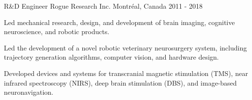\begin{cventries}
\cventry
{R\&D Engineer}
{Rogue Research Inc.}
{Montréal, Canada}
{2011 - 2018}
{
\begin{cvitems}
\item{Led mechanical research, design, and development of brain imaging, cognitive neuroscience, and robotic products.}
\item{Led the development of a novel robotic veterinary neurosurgery system, including trajectory generation algorithms, computer vision, and hardware design.}
\item{Developed devices and systems for transcranial magnetic stimulation (TMS), near infrared spectroscopy (NIRS), deep brain stimulation (DBS), and image-based neuronavigation.}
\end{cvitems}
}

\end{cventries}
